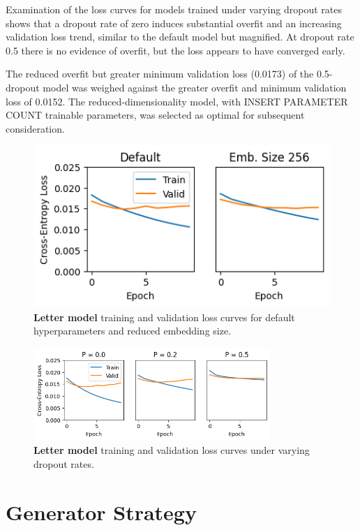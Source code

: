 \documentclass[letterpaper]{article} %
\begin{document}
\begin{NoHyper}
Examination of the loss curves for models trained under varying dropout rates shows that a dropout rate of zero induces substantial overfit and an increasing validation loss trend, similar to the default model but magnified.
At dropout rate 0.5 there is no evidence of overfit, but the loss appears to have converged early.

The reduced overfit but greater minimum validation loss (0.0173) of the 0.5-dropout model was weighed against the greater overfit and minimum validation loss of 0.0152.
The reduced-dimensionality model, with INSERT PARAMETER COUNT trainable parameters, was selected as optimal for subsequent consideration.

\begin{figure}
\centering
\includegraphics[width=0.9\columnwidth]{fig-charmark-loss-default-and-embsize}
\caption{\textbf{Letter model} training and validation loss curves for default hyperparameters and reduced embedding size.}
\label{fig:charmark-loss-df}
\end{figure}

\begin{figure}
\centering
\includegraphics[width=0.8\textwidth]{fig-charmark-loss-dropout}
\caption{\textbf{Letter model} training and validation loss curves under varying dropout rates.}
\label{fig:charmark-loss-dropout}
\end{figure}



\section{Generator Strategy}
\label{sec:generator}


\end{NoHyper}
\end{document}
